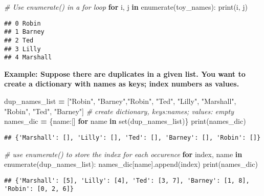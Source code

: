 \documentclass[
]{book}
\newenvironment{Shaded}{\begin{snugshade}}{\end{snugshade}}
\newcommand{\BuiltInTok}[1]{#1}
\newcommand{\CommentTok}[1]{\textcolor[rgb]{0.56,0.35,0.01}{\textit{#1}}}
\newcommand{\ControlFlowTok}[1]{\textcolor[rgb]{0.13,0.29,0.53}{\textbf{#1}}}
\newcommand{\KeywordTok}[1]{\textcolor[rgb]{0.13,0.29,0.53}{\textbf{#1}}}
\newcommand{\NormalTok}[1]{#1}
\newcommand{\OperatorTok}[1]{\textcolor[rgb]{0.81,0.36,0.00}{\textbf{#1}}}
\newcommand{\StringTok}[1]{\textcolor[rgb]{0.31,0.60,0.02}{#1}}
\begin{document}
\begin{Shaded}
\begin{Highlighting}[]
\CommentTok{\# Use enumerate() in a for loop}
\ControlFlowTok{for}\NormalTok{ i, j }\KeywordTok{in} \BuiltInTok{enumerate}\NormalTok{(toy\_names):}
  \BuiltInTok{print}\NormalTok{(i, j)}
\end{Highlighting}
\end{Shaded}

\begin{verbatim}
## 0 Robin
## 1 Barney
## 2 Ted
## 3 Lilly
## 4 Marshall
\end{verbatim}

\textbf{Example: Suppose there are duplicates in a given list. You want to create a dictionary with names as keys; index numbers as values.}

\begin{Shaded}
\begin{Highlighting}[]
\NormalTok{dup\_names\_list }\OperatorTok{=}\NormalTok{ [}\StringTok{"Robin"}\NormalTok{, }\StringTok{"Barney"}\NormalTok{,}\StringTok{"Robin"}\NormalTok{, }\StringTok{"Ted"}\NormalTok{, }\StringTok{"Lilly"}\NormalTok{, }\StringTok{"Marshall"}\NormalTok{, }\StringTok{"Robin"}\NormalTok{, }\StringTok{"Ted"}\NormalTok{, }\StringTok{"Barney"}\NormalTok{]}
\CommentTok{\# create dictionary, keys:names; values: empty}
\NormalTok{names\_dic }\OperatorTok{=}\NormalTok{ \{name:[] }\ControlFlowTok{for}\NormalTok{ name }\KeywordTok{in} \BuiltInTok{set}\NormalTok{(dup\_names\_list)\}}
\BuiltInTok{print}\NormalTok{(names\_dic)}
\end{Highlighting}
\end{Shaded}

\begin{verbatim}
## {'Marshall': [], 'Lilly': [], 'Ted': [], 'Barney': [], 'Robin': []}
\end{verbatim}

\begin{Shaded}
\begin{Highlighting}[]
\CommentTok{\# use enumerate() to store the index for each occurence}
\ControlFlowTok{for}\NormalTok{ index, name }\KeywordTok{in} \BuiltInTok{enumerate}\NormalTok{(dup\_names\_list):}
\NormalTok{  names\_dic[name].append(index)}
\BuiltInTok{print}\NormalTok{(names\_dic)}
\end{Highlighting}
\end{Shaded}

\begin{verbatim}
## {'Marshall': [5], 'Lilly': [4], 'Ted': [3, 7], 'Barney': [1, 8], 'Robin': [0, 2, 6]}
\end{verbatim}
\end{document}
